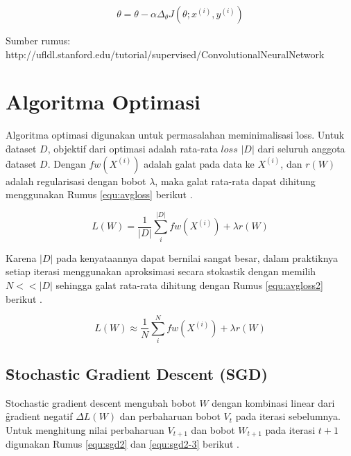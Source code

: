 \begin{equation}
\label{equ:sgd}
\theta = \theta-\alpha\Delta_{\theta}J(\theta;x^{(i)},y^{(i)})
\end{equation}

\begin{center}
	{\small Sumber rumus: http://ufldl.stanford.edu/tutorial/supervised/ConvolutionalNeuralNetwork}
\end{center}


\section{Algoritma Optimasi}
Algoritma optimasi digunakan untuk permasalahan meminimalisasi \f{loss}. Untuk \f{dataset} $D$, objektif dari optimasi adalah rata-rata $loss$ $|D|$ dari seluruh anggota \f{dataset} $D$. Dengan $fw(X^{(i)})$ adalah galat pada data ke $X^{(i)}$, dan $r(W)$ adalah regularisasi dengan bobot $\lambda$, maka galat rata-rata dapat dihitung menggunakan Rumus \ref{equ:avgloss} berikut .

\begin{equation}
\label{equ:avgloss}
L(W)=\frac{1}{|D|}\sum\limits_{i}^{|D|}fw(X^{(i)})+\lambda r(W)
\end{equation}

Karena $|D|$ pada kenyataannya dapat bernilai sangat besar, dalam praktiknya setiap iterasi menggunakan aproksimasi secara stokastik dengan memilih $N << |D|$ sehingga galat rata-rata dihitung dengan Rumus \ref{equ:avgloss2} berikut .

\begin{equation}
\label{equ:avgloss2}
L(W)\approx\frac{1}{N}\sum\limits_{i}^{N}fw(X^{(i)})+\lambda r(W)
\end{equation}
\subsection{\f{Stochastic Gradient Descent} (SGD)}
\f{Stochastic gradient descent} mengubah bobot $W$ dengan kombinasi linear dari \f{gradient} negatif $\Delta L(W)$ dan perbaharuan bobot $V_{t}$ pada iterasi sebelumnya. Untuk menghitung nilai perbaharuan $V_{t+1}$ dan bobot $W_{t+1}$ pada iterasi $t+1$ digunakan Rumus \ref{equ:sgd2} dan \ref{equ:sgd2-3} berikut .

